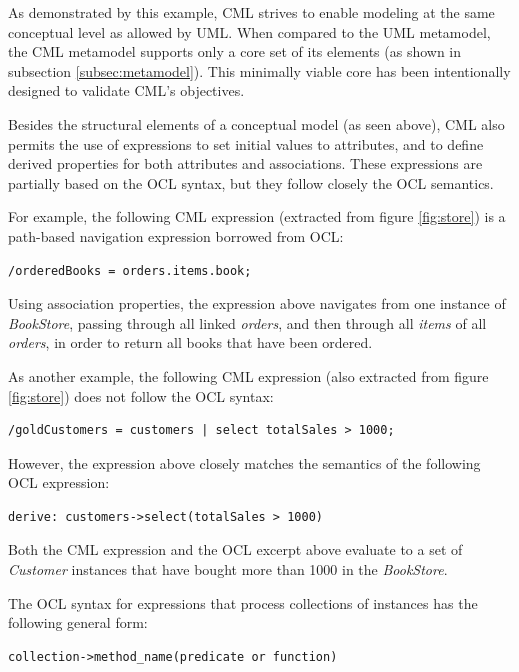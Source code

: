 As demonstrated by this example,
CML strives to enable modeling at the same conceptual level as allowed by UML.
When compared to the UML metamodel,
the CML metamodel supports only a core set of its elements (as shown in subsection \ref{subsec:metamodel}).
This minimally viable core has been intentionally designed to validate CML's objectives.

Besides the structural elements of a conceptual model (as seen above),
CML also permits the use of expressions to set initial values to attributes,
and to define derived properties for both attributes and associations.
These expressions are partially based on the OCL \cite{ocl} syntax,
but they follow closely the OCL semantics.

For example, the following CML expression (extracted from figure \ref{fig:store}) is a path-based navigation expression borrowed from OCL:

\verbatimfont{\small}
\begin{verbatim}
/orderedBooks = orders.items.book;
\end{verbatim}

Using association properties, the expression above navigates from one instance of \emph{BookStore}, passing through all linked \emph{orders}, and then through all \emph{items} of all \emph{orders}, in order to return all books that have been ordered. 

As another example,
the following CML expression (also extracted from figure \ref{fig:store}) does not follow the OCL syntax:

\verbatimfont{\small}
\begin{verbatim}
/goldCustomers = customers | select totalSales > 1000;
\end{verbatim}

However, the expression above closely matches the semantics of the following OCL expression:

\verbatimfont{\small}
\begin{verbatim}
derive: customers->select(totalSales > 1000)
\end{verbatim}

Both the CML expression and the OCL excerpt above evaluate to a set of \emph{Customer} instances
that have bought more than 1000 in the \emph{BookStore}. 

The OCL syntax for expressions that process collections of instances has the following general form:

\verbatimfont{\small}
\begin{verbatim}
collection->method_name(predicate or function)
\end{verbatim}

